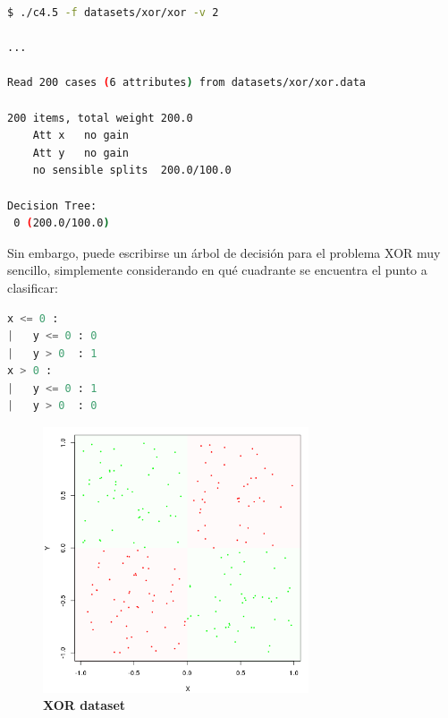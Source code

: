 \documentclass[a4paper, 11pt]{article} %
\begin{document}
\pagebreak

\begin{lstlisting}[language=Bash, xleftmargin = 2cm]
$ ./c4.5 -f datasets/xor/xor -v 2

...

Read 200 cases (6 attributes) from datasets/xor/xor.data

200 items, total weight 200.0
	Att x	no gain
	Att y	no gain
	no sensible splits  200.0/100.0

Decision Tree:
 0 (200.0/100.0)
\end{lstlisting}


Sin embargo, puede escribirse un árbol de decisión para el problema XOR muy
sencillo, simplemente considerando en qué cuadrante se encuentra el punto a
clasificar:\\

\begin{lstlisting}[language=Python, xleftmargin = 2cm]
x <= 0 :
|   y <= 0 : 0
|   y > 0  : 1
x > 0 :
|   y <= 0 : 1
|   y > 0  : 0
\end{lstlisting}

\begin{figure}[H]
\captionsetup[subfigure]{labelformat=empty}
  \centering
  \caption*{\textbf{XOR dataset}}
  \includegraphics[width=0.7\textwidth]{xor_classes.png}
\end{figure}
\end{document}

